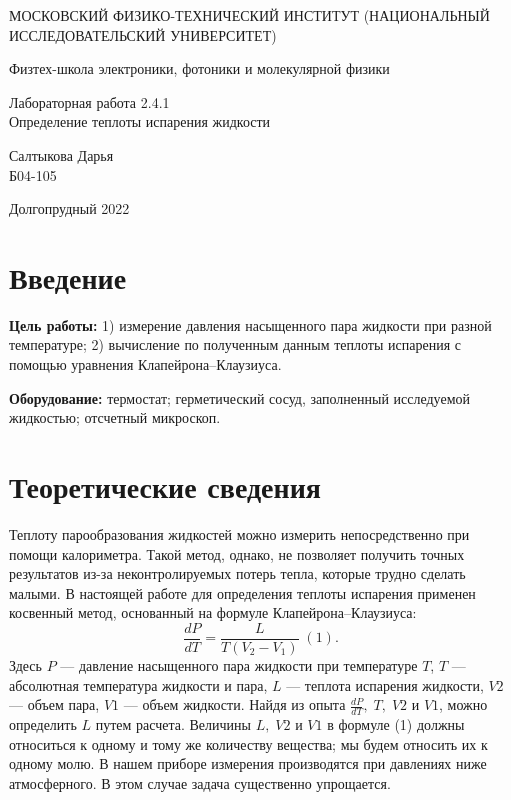 \documentclass[a4paper,12pt]{article} %
\begin{document}
	
	\begin{titlepage}
	\begin{center}
		{\large МОСКОВСКИЙ ФИЗИКО-ТЕХНИЧЕСКИЙ ИНСТИТУТ (НАЦИОНАЛЬНЫЙ ИССЛЕДОВАТЕЛЬСКИЙ УНИВЕРСИТЕТ)}
	\end{center}
	\begin{center}
		{\large Физтех-школа электроники, фотоники и молекулярной физики}
	\end{center}
	
	
	\vspace{4.5cm}
	{\huge
		\begin{center}
			{Лабораторная работа 2.4.1}\\
			Определение теплоты испарения жидкости
		\end{center}
	}
	\vspace{2cm}
	\begin{flushright}
		{\LARGE Салтыкова Дарья \\
			\vspace{0.5cm}
			Б04-105}
	\end{flushright}
	\vspace{8cm}
	\begin{center}
		Долгопрудный 2022
	\end{center}
\end{titlepage}

\section{Введение}

\textbf{Цель работы:} 1) измерение давления насыщенного пара жидкости при разной температуре; 2) вычисление по полученным данным теплоты испарения с помощью уравнения Клапейрона–Клаузиуса.
\medskip

\noindent \textbf{Оборудование:} термостат; герметический сосуд, заполненный исследуемой жидкостью; отсчетный микроскоп.
\medskip

\section{Теоретические сведения}

Теплоту парообразования жидкостей можно измерить непосредственно при помощи калориметра. Такой метод, однако, не позволяет получить точных результатов из-за неконтролируемых потерь тепла, которые трудно сделать малыми. В настоящей работе для определения теплоты испарения применен
косвенный метод, основанный на формуле Клапейрона–Клаузиуса: $$\frac{dP}
{dT} = \frac{L}{T(V_2 - V_1)}\;(1).$$
Здесь $P$ — давление насыщенного пара жидкости при температуре $T$, $T$ — абсолютная температура жидкости и пара, $L$ — теплота испарения жидкости, $V2$ — объем пара, $V1$ — объем жидкости. Найдя из опыта $\frac{dP}{dT},\; T,\; V2$ и $V1$, можно определить $L$ путем расчета. Величины $L, \;V2$ и $V1$ в формуле (1) должны относиться к одному и тому же количеству вещества; мы будем относить их к одному молю.
В нашем приборе измерения производятся при давлениях ниже атмосферного. В этом случае задача существенно упрощается.
\end{document}
